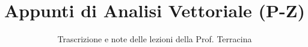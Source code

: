 \documentclass[a4paper,12pt]{article}
\title{Appunti di Analisi Vettoriale (P-Z)}
\author{Trascrizione e note delle lezioni della Prof. Terracina}
\date{}
\begin{document}
\maketitle
\projectintro
\tableofcontents
\newpage

\end{document}
